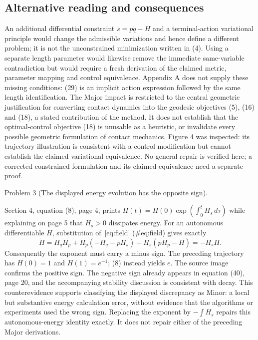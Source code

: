 \documentclass[10pt]{article}
\begin{document}
\subsection*{Alternative reading and consequences}
An additional differential constraint \(\dot s=p\dot q-H\) and a terminal-action variational principle would change the admissible variations and hence define a different problem; it is not the unconstrained minimization written in (4). Using a separate length parameter would likewise remove the immediate same-variable contradiction but would require a fresh derivation of the claimed metric, parameter mapping and control equivalence. Appendix A does not supply these missing conditions: (29) is an implicit action expression followed by the same length identification. The Major impact is restricted to the central geometric justification for converting contact dynamics into the geodesic objectives (5), (16) and (18), a stated contribution of the method. It does not establish that the optimal-control objective (18) is unusable as a heuristic, or invalidate every possible geometric formulation of contact mechanics. Figure 4 was inspected: its trajectory illustration is consistent with a control modification but cannot establish the claimed variational equivalence. No general repair is verified here; a corrected constrained formulation and its claimed equivalence need a separate proof.\par
Problem 3 (The displayed energy evolution has the opposite sign).\par
Section 4, equation (8), page 4, prints \(H(t)=H(0)\exp(\int_0^t H_s\,d\tau)\) while explaining on page 5 that \(H_s>0\) dissipates energy. For an autonomous differentiable \(H\), substitution of [eq:field] (\#eq:field) gives exactly \[\dot H=H_qH_p+H_p(-H_q-pH_s)+H_s(pH_p-H)=-H_sH.\] Consequently the exponent must carry a minus sign. The preceding trajectory has \(H(0)=1\) and \(H(1)=e^{-1}\); (8) instead yields \(e\). The source image confirms the positive sign. The negative sign already appears in equation (40), page 20, and the accompanying stability discussion is consistent with decay. This counterevidence supports classifying the displayed discrepancy as Minor: a local but substantive energy calculation error, without evidence that the algorithms or experiments used the wrong sign. Replacing the exponent by \(-\int H_s\) repairs this autonomous-energy identity exactly. It does not repair either of the preceding Major derivations.\par
\end{document}
